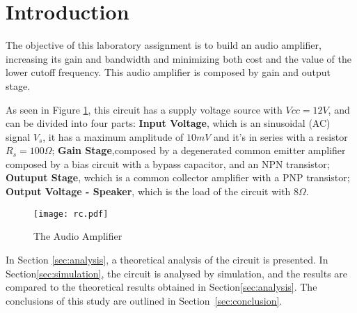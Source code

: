 \section{Introduction}
\label{sec:introduction}

The objective of this laboratory assignment is to build an audio amplifier, increasing its gain and bandwidth and minimizing both cost and the value of the lower cutoff frequency. This audio amplifier is composed by gain and output stage.

As seen in Figure \ref{fig:rc}, this circuit has a supply voltage source with $Vcc=12 V$, and can be divided into four parts: \textbf{Input Voltage}, which is an sinusoidal (AC) signal $V_s$, it has a maximum amplitude of $10 mV$ and it's in series with a resistor $R_s=100 \Omega$; \textbf{Gain Stage},composed by a degenerated common emitter amplifier composed by a bias circuit with a bypass capacitor, and an NPN transistor; \textbf{Outuput Stage}, wchich is a common collector amplifier with a PNP transistor; \textbf{Output Voltage - Speaker}, which is the load of the circuit with $8 \Omega$.


\begin{figure}[h] \centering
\texttt{[image: rc.pdf]}
\vspace{-5mm}
\caption{The Audio Amplifier}
\label{fig:rc}
\end{figure}



In Section \ref{sec:analysis}, a theoretical analysis of the circuit is presented. In Section\ref{sec:simulation}, the circuit is analysed by simulation, and the results are compared to the theoretical results obtained in Section\ref{sec:analysis}. The conclusions of this study are outlined in Section~\ref{sec:conclusion}.





